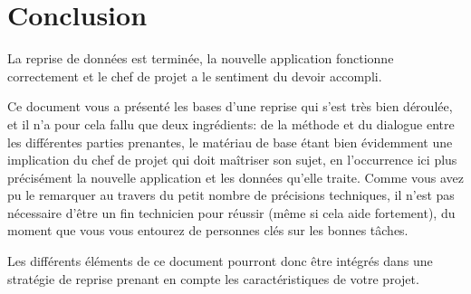 \documentclass{book}
\begin{document}
\chapter{Conclusion}

La reprise de données est terminée, la nouvelle application fonctionne correctement et le chef de projet a le sentiment du devoir accompli.

Ce document vous a présenté les bases d'une reprise qui s'est très bien déroulée, et il n'a pour cela fallu que deux ingrédients: de la méthode et du dialogue entre les différentes parties prenantes, le matériau de base étant bien évidemment une implication du chef de projet qui doit maîtriser son sujet, en l'occurrence ici plus précisément la nouvelle application et les données qu'elle traite. Comme vous avez pu le remarquer au travers du petit nombre de précisions techniques, il n'est pas nécessaire d'être un fin technicien pour réussir (même si cela aide fortement), du moment que vous vous entourez de personnes clés sur les bonnes tâches.

Les différents éléments de ce document pourront donc être intégrés dans une stratégie de reprise prenant en compte les caractéristiques de votre projet.

\printglossary[type=\acronymtype]
\newpage
\printglossary[type=main]
\end{document}
